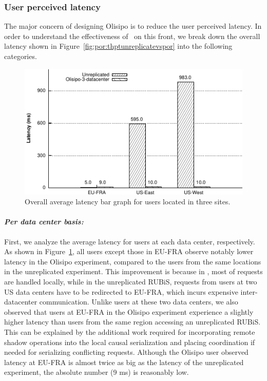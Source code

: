 \subsubsection{User perceived latency}
The major concern of designing Olisipo is to reduce the user perceived latency. In order
to understand the effectiveness of \coordtool\ on this front, we break down the overall latency shown in Figure~\ref{fig:por:thptunreplicatevspor}
into the following categories.
\begin{figure}[t!]
  \centering
\includegraphics[width=0.85\columnwidth]{figures/eval/avg_latency_unreplicated_vs_por.pdf}
  \caption{Overall average latency bar graph for users located in three sites.}
 \label{fig:por:avglatenunreplicatevspor}
\end{figure}
\paragraph{{\em Per data center basis:}} First, we analyze the average latency
for users at each data center, respectively. As shown in Figure~\ref{fig:por:avglatenunreplicatevspor},
all users except those in EU-FRA observe notably lower latency in the Olisipo experiment, compared
to the users from the same locations in the unreplicated experiment. This improvement is because in \coordtool, most of
requests are handled locally, while in the unreplicated RUBiS, requests from users at
two US data centers have to be redirected to EU-FRA, which incurs expensive inter-datacenter communication. Unlike users at these two data centers, we also
observed that users at EU-FRA in the Olisipo experiment experience a slightly higher latency than users
from the same region accessing an unreplicated RUBiS. This can be explained by the additional work required
for incorporating remote shadow operations into the local causal serialization and placing coordination if needed for
serializing conflicting requests. Although the Olisipo user observed latency at EU-FRA is almost twice as
big as the latency of the unreplicated experiment, the absolute number (9 ms) is reasonably low.

